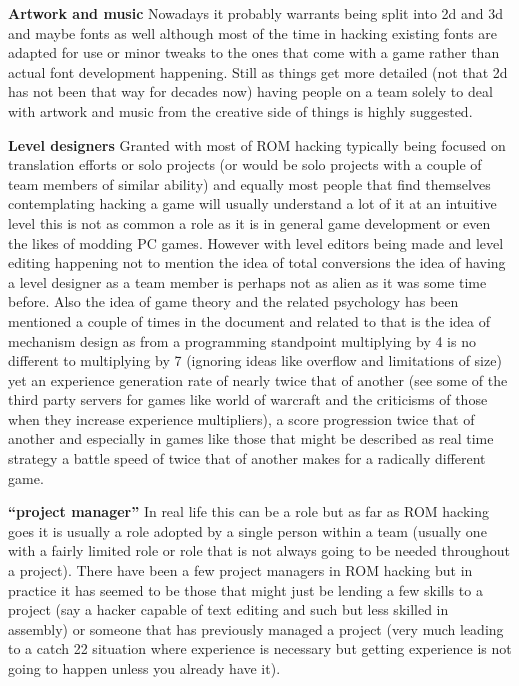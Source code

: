 \documentclass[
]{book}
\begin{document}
\textbf{Artwork and music} Nowadays it probably warrants being split into 2d and 3d and maybe fonts as well although most of the time in hacking existing fonts are adapted for use or minor tweaks to the ones that come with a game rather than actual font development happening. Still as things get more detailed (not that 2d has not been that way for decades now) having people on a team solely to deal with artwork and music from the creative side of things is highly suggested.

\textbf{Level designers} Granted with most of ROM hacking typically being focused on translation efforts or solo projects (or would be solo projects with a couple of team members of similar ability) and equally most people that find themselves contemplating hacking a game will usually understand a lot of it at an intuitive level this is not as common a role as it is in general game development or even the likes of modding PC games. However with level editors being made and level editing happening not to mention the idea of total conversions the idea of having a level designer as a team member is perhaps not as alien as it was some time before. Also the idea of game theory and the related psychology has been mentioned a couple of times in the document and related to that is the idea of mechanism design as from a programming standpoint multiplying by 4 is no different to multiplying by 7 (ignoring ideas like overflow and limitations of size) yet an experience generation rate of nearly twice that of another (see some of the third party servers for games like world of warcraft and the criticisms of those when they increase experience multipliers), a score progression twice that of another and especially in games like those that might be described as real time strategy a battle speed of twice that of another makes for a radically different game.

\textbf{``project manager''} In real life this can be a role but as far as ROM hacking goes it is usually a role adopted by a single person within a team (usually one with a fairly limited role or role that is not always going to be needed throughout a project). There have been a few project managers in ROM hacking but in practice it has seemed to be those that might just be lending a few skills to a project (say a hacker capable of text editing and such but less skilled in assembly) or someone that has previously managed a project (very much leading to a catch 22 situation where experience is necessary but getting experience is not going to happen unless you already have it).
\end{document}
